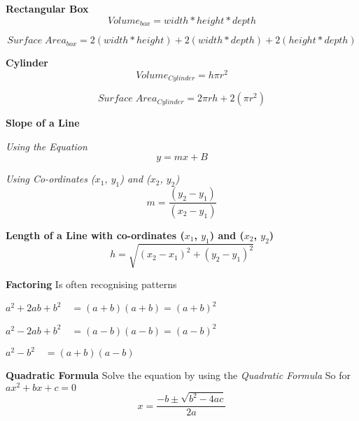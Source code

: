 \documentclass{article}
\begin{document}
\textbf{Rectangular Box}
\begin{equation}
Volume_{box} = width * height * depth
\end{equation}

\begin{equation}
Surface\;Area_{box} = 2(width * height) + 2(width * depth) + 2(height * depth)
\end{equation}

\textbf{Cylinder}
\begin{equation}
Volume_{ Cylinder} = h \pi r^ 2
\end{equation}

\begin{equation}
Surface\;Area_{ Cylinder} = 2 \pi r h + 2(\pi r^ 2 )
\end{equation}

\textbf{Slope of a Line}

\textit{Using the Equation}
\begin{equation}
y = mx + B
\end{equation}

\textit{Using Co-ordinates ($x_1$, $y_1$) and ($x_2$, $y_2$) }
\begin{equation}
m = \frac{ (y_2 - y_1) }{ (x_2 - y_1) }
\end{equation}

\textbf{Length of a Line with co-ordinates  ($x_1$, $y_1$) and ($x_2$, $y_2$) }
\begin{equation}
h= \sqrt{(x_{2}-x_{1})^2 + (y_{2}-y_{1})^2}
\end{equation}


\textbf{Factoring}
Is often recognising patterns

$a^{2} + 2ab + b^{2} \quad= (a + b) (a + b)  = (a + b)^{2}$

$a^{2} - 2ab + b^{2} \quad= (a - b) (a - b)  = (a - b)^{2}$

$a^{2} - b^{2} \quad= (a + b) (a - b)$


\textbf{Quadratic Formula}
Solve the equation by using the \textit{Quadratic Formula}  
So for $ax^{2} + bx + c = 0$
\begin{equation}
x = \frac{-b \pm \sqrt{b^{2}-4ac}}{2a}
\end{equation}
\end{document}
